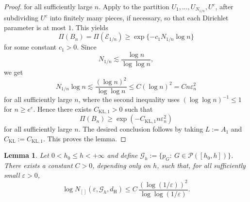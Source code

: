\documentclass[twoside,12pt]{article}
\newtheorem{lem}[thm]{Lemma}
\begin{document}
\begin{proof}
for all sufficiently large $n$. Apply \citet[Lemma A.2]{Gho(01)} to the partition $U_1,\dots,U_{N_{1/n}},U^c$, after subdividing $U^c$ into finitely many pieces, if necessary, so that each Dirichlet parameter is at most $1$. This yields
\begin{displaymath}
\Pi(B_n)=\Pi(\mathcal E_{1/n})\ge\exp\{-c_1N_{1/n}\log n\}
\end{displaymath}
for some constant $c_1>0$. Since
\begin{displaymath}
N_{1/n}\lesssim\frac{\log n}{\log\log n},
\end{displaymath}
we get
\begin{displaymath}
N_{1/n}\log n\lesssim\frac{(\log n)^2}{\log\log n}\le C(\log n)^2=C n\varepsilon_n^2
\end{displaymath}
for all sufficiently large $n$, where the second inequality uses $(\log\log n)^{-1}\le 1$ for $n\ge e^e$. Hence there exists $C_{\mathrm{KL},1}>0$ such that
\begin{displaymath}
\Pi(B_n)\ge \exp(-C_{\mathrm{KL},1}n\varepsilon_n^2)
\end{displaymath}
for all sufficiently large $n$. The desired conclusion follows by taking $L:=A_1$ and $C_{\mathrm{KL}}:=C_{\mathrm{KL},1}$. This proves the lemma.
\end{proof}

\begin{lem}\label{lem:Poisson_bracketing_entropy}
Let $0<h_0\le h<+\infty$ and define $\mathcal G_h:=\{p_G:\ G\in\mathcal P([h_0,h])\}$. There exists a constant $C>0$, depending only on $h$, such that, for all
sufficiently small $\varepsilon>0$,
\begin{displaymath}
\log N_{[]}(\varepsilon,\mathcal G_h,d_{\mathrm H})\le C\,\frac{(\log(1/\varepsilon))^2}{\log\log(1/\varepsilon)}.
\end{displaymath}
\end{lem}
\end{document}
